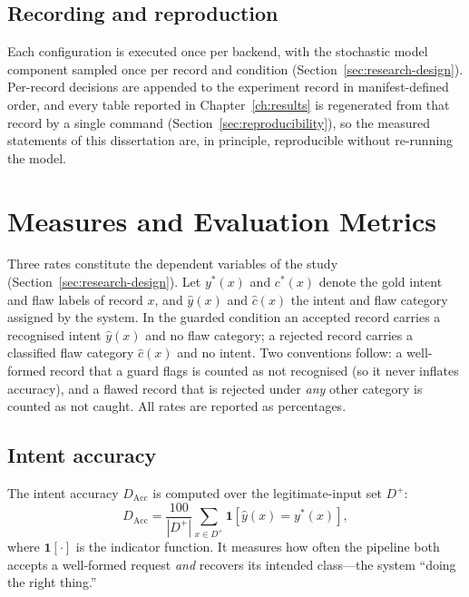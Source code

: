 \subsection*{Recording and reproduction}

Each configuration is executed once per backend, with the stochastic model
component sampled once per record and condition (Section~\ref{sec:research-design}).
Per-record decisions are appended to the experiment record in manifest-defined
order, and every table reported in Chapter~\ref{ch:results} is regenerated from
that record by a single command (Section~\ref{sec:reproducibility}), so the
measured statements of this dissertation are, in principle, reproducible without
re-running the model.


\section{Measures and Evaluation Metrics}\label{sec:measures}

Three rates constitute the dependent variables of the study
(Section~\ref{sec:research-design}). Let $y^\ast(x)$ and $c^\ast(x)$ denote the
gold intent and flaw labels of record $x$, and $\hat{y}(x)$ and $\hat{c}(x)$ the
intent and flaw category assigned by the system. In the guarded condition an
accepted record carries a recognised intent $\hat{y}(x)$ and no flaw category;
a rejected record carries a classified flaw category $\hat{c}(x)$ and no intent.
Two conventions follow: a well-formed record that a guard flags is counted as
not recognised (so it never inflates accuracy), and a flawed record that is
rejected under \emph{any} other category is counted as not caught. All rates are
reported as percentages.

\subsection*{Intent accuracy}

The intent accuracy $D_{\mathrm{Acc}}$ is computed over the legitimate-input set
$D^+$:
\begin{equation}
D_{\mathrm{Acc}}=\frac{100}{|D^+|}\sum_{x\in D^+}
\mathbf{1}\!\left[\hat{y}(x)=y^\ast(x)\right],
\label{eq:metric-dacc}
\end{equation}
where $\mathbf{1}[\cdot]$ is the indicator function. It measures how often the
pipeline both accepts a well-formed request \emph{and} recovers its intended
class---the system ``doing the right thing.''

